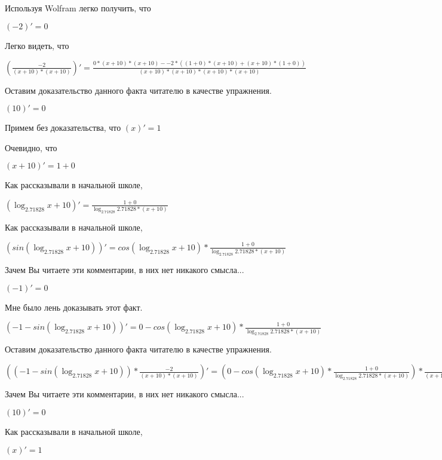 \documentclass[12pt,a4paper,fleqn]{article}
\theoremstyle{definition}
\begin{document}
Используя Wolfram легко получить, что

$( -2 )' =  0 $

Легко видеть, что

$(\frac{ -2 }{( x  +  10 ) * ( x  +  10 )}
)' = \frac{ 0  * ( x  +  10 ) * ( x  +  10 ) -  -2  * (( 1  +  0 ) * ( x  +  10 ) + ( x  +  10 ) * ( 1  +  0 ))}{( x  +  10 ) * ( x  +  10 ) * ( x  +  10 ) * ( x  +  10 )}
$

Оставим доказательство данного факта читателю в качестве упражнения.

$( 10 )' =  0 $

Примем без доказательства, что
$( x )' =  1 $

Очевидно, что

$( x  +  10 )' =  1  +  0 $

Как рассказывали в начальной школе,

$(\log_{ 2.71828 }{ x  +  10 })' = \frac{ 1  +  0 }{\log_{ 2.71828 }{ 2.71828 } * ( x  +  10 )}
$

Как рассказывали в начальной школе,

$(sin(\log_{ 2.71828 }{ x  +  10 }))' = cos(\log_{ 2.71828 }{ x  +  10 }) * \frac{ 1  +  0 }{\log_{ 2.71828 }{ 2.71828 } * ( x  +  10 )}
$

Зачем Вы читаете эти комментарии, в них нет никакого смысла...

$( -1 )' =  0 $

Мне было лень доказывать этот факт.

$( -1  - sin(\log_{ 2.71828 }{ x  +  10 }))' =  0  - cos(\log_{ 2.71828 }{ x  +  10 }) * \frac{ 1  +  0 }{\log_{ 2.71828 }{ 2.71828 } * ( x  +  10 )}
$

Оставим доказательство данного факта читателю в качестве упражнения.

$(( -1  - sin(\log_{ 2.71828 }{ x  +  10 })) * \frac{ -2 }{( x  +  10 ) * ( x  +  10 )}
)' = ( 0  - cos(\log_{ 2.71828 }{ x  +  10 }) * \frac{ 1  +  0 }{\log_{ 2.71828 }{ 2.71828 } * ( x  +  10 )}
) * \frac{ -2 }{( x  +  10 ) * ( x  +  10 )}
 + ( -1  - sin(\log_{ 2.71828 }{ x  +  10 })) * \frac{ 0  * ( x  +  10 ) * ( x  +  10 ) -  -2  * (( 1  +  0 ) * ( x  +  10 ) + ( x  +  10 ) * ( 1  +  0 ))}{( x  +  10 ) * ( x  +  10 ) * ( x  +  10 ) * ( x  +  10 )}
$

Зачем Вы читаете эти комментарии, в них нет никакого смысла...

$( 10 )' =  0 $

Как рассказывали в начальной школе,

$( x )' =  1 $
\end{document}
